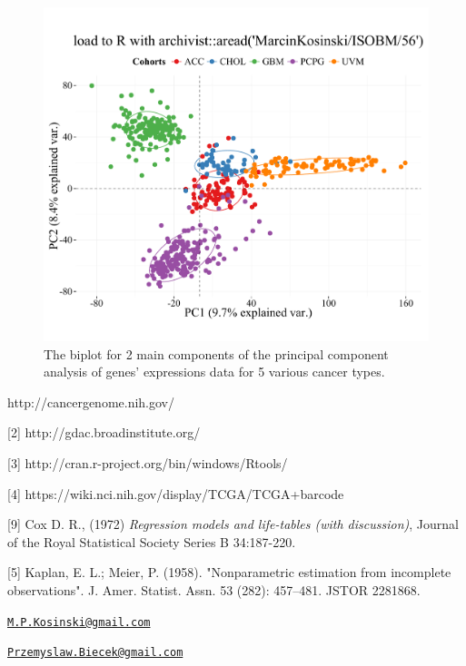 \begin{figure}[h!]
\includegraphics[width=12cm]{rnaseq_biplot.pdf}
\caption{\label{biplot2}The biplot for 2 main components of the principal component analysis of genes' expressions data for 5 various cancer types.}
\end{figure}

\newpage

\begin{Schunk}
\begin{Sinput}
[1] http://cancergenome.nih.gov/

[2] http://gdac.broadinstitute.org/
   
[3] http://cran.r-project.org/bin/windows/Rtools/
   
[4] https://wiki.nci.nih.gov/display/TCGA/TCGA+barcode

[9] Cox D. R., (1972) \textit{Regression models and life-tables (with discussion)}, Journal of the Royal Statistical Society Series B 34:187-220.      
      
[5]  Kaplan, E. L.; Meier, P. (1958). "Nonparametric estimation from incomplete observations". J. Amer. Statist. Assn. 53 (282): 457–481. JSTOR 2281868.


\end{Sinput}
\end{Schunk}

\address{
Marcin Kosinski\\
Warsaw University of Technology\\
Faculty of Mathematics and Information Science\\ Koszykowa 75, 00-662 Warsaw, Poland\\
}
\href{mailto:M.P.Kosinski@gmail.com}{\nolinkurl{M.P.Kosinski@gmail.com}}

\address{
Przemysław Biecek\\
University of Warsaw\\
Faculty of Mathematics, Informatics, and Mechanics\\ Banacha 2, 02-097 Warsaw, Poland\\
}
\href{mailto:Przemyslaw.Biecek@gmail.com}{\nolinkurl{Przemyslaw.Biecek@gmail.com}}

